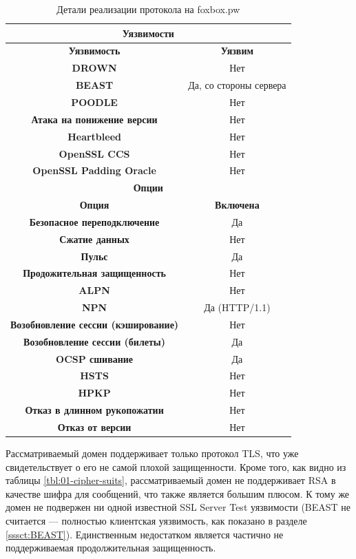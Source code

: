 \begin{table}[H]
    \centering
    \begin{tabular}{c|c}
        \hline
        \multicolumn{2}{c}{\textbf{Уязвимости}} \\ \hline
        \textbf{Уязвимость} & \textbf{Уязвим} \\ \hline
        \textbf{DROWN} & Нет \\
        \textbf{BEAST} & Да, со стороны сервера \\
        \textbf{POODLE} & Нет \\
        \textbf{Атака на понижение версии} & Нет \\
        \textbf{Heartbleed} & Нет \\
        \textbf{OpenSSL CCS} & Нет \\
        \textbf{OpenSSL Padding Oracle} & Нет \\ \hline
        \multicolumn{2}{c}{\textbf{Опции}} \\ \hline
        \textbf{Опция} & \textbf{Включена} \\ \hline 
        \textbf{Безопасное переподключение} & Да \\ 
        \textbf{Сжатие данных} & Нет \\ 
        \textbf{Пульс} & Да \\ 
        \textbf{Продожительная защищенность} & Нет \\ 
        \textbf{ALPN} & Нет \\ 
        \textbf{NPN} & Да (HTTP/1.1) \\ 
        \textbf{Возобновление сессии (кэширование)} & Нет \\
        \textbf{Возобновление сессии (билеты)} & Да  \\
        \textbf{OCSP сшивание} & Да  \\
        \textbf{HSTS} & Нет \\ 
        \textbf{HPKP} & Нет \\ 
        \textbf{Отказ в длинном рукопожатии} & Нет \\ 
        \textbf{Отказ от версии} & Нет \\ 
    \end{tabular}
    \caption{Детали реализации протокола на foxbox.pw}
    \label{01-protocol-details}
\end{table}

Рассматриваемый домен поддерживает только протокол TLS, что уже свидетельствует о его не самой плохой защищенности. Кроме того, 
как видно из таблицы \ref{tbl:01-cipher-suits}, рассматриваемый домен не поддерживает RSA в качестве шифра для сообщений, что также
является большим плюсом. К тому же домен не подвержен ни одной известной SSL Server Test уязвимости (BEAST не считается --- полностью
клиентская уязвимость, как показано в разделе \ref{sssct:BEAST}). Единственным недостатком является частично не поддерживаемая 
продолжительная защищенность. 